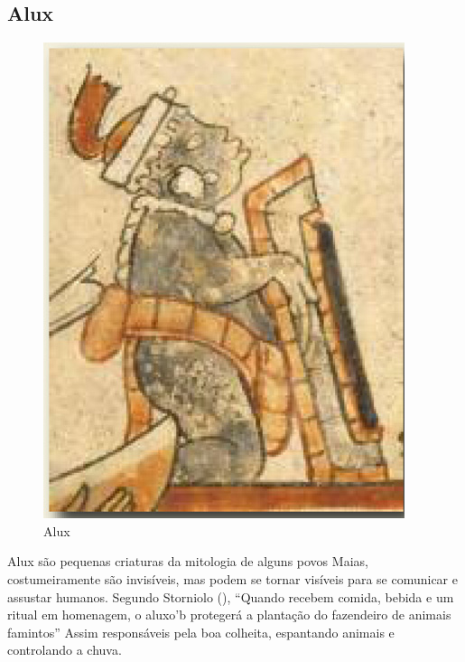 \vfill
\pagebreak


\subsection{Alux}
\begin{figure}[htb]
	\caption{\label{fig_alux}Alux}
	\begin{center}
	    \includegraphics[width=\textwidth/2]{imagens/alux.jpg}
	\end{center}
\end{figure}

Alux são pequenas criaturas da mitologia de alguns povos Maias, costumeiramente são invisíveis, mas podem se tornar visíveis para se comunicar e assustar humanos. Segundo Storniolo (\citeyear[Livre tradução]{storniolo2009out}), ``Quando recebem comida, bebida e um ritual em homenagem, o aluxo'b protegerá a plantação do fazendeiro de animais famintos'' Assim responsáveis pela boa colheita, espantando animais e controlando a chuva.

